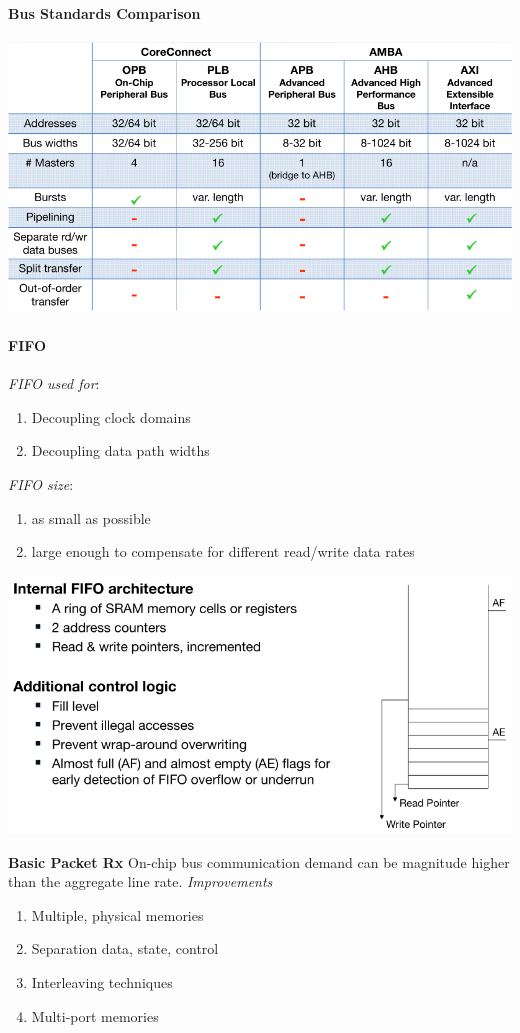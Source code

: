 \documentclass[english]{latex4ei/latex4ei_sheet}
\begin{document}
\paragraph{Bus Standards Comparison}
\begin{center}
	\includegraphics[width=0.75\linewidth]{images//6.Interconnects/BusComparison.png}
\end{center}


\paragraph{FIFO}

\textit{FIFO used for}:
\begin{enumerate}
	\item Decoupling clock domains
	\item Decoupling data path widths
\end{enumerate}
\textit{FIFO size}:
\begin{enumerate}
	\item as small as possible
	\item large enough to compensate for different read/write data rates
\end{enumerate}
\begin{center}
	\includegraphics[width=0.75\linewidth]{images//6.Interconnects/FIFO.png}
\end{center}

\textbf{Basic Packet Rx} On-chip bus communication demand can be magnitude higher than the aggregate line rate.
\textit{Improvements}
\begin{enumerate}
	\item Multiple, physical memories
	\item Separation data, state, control
	\item Interleaving techniques
	\item Multi-port memories
\end{enumerate}
\end{document}
